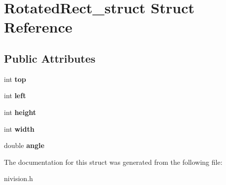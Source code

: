 \hypertarget{structRotatedRect__struct}{\section{\-Rotated\-Rect\-\_\-struct \-Struct \-Reference}
\label{structRotatedRect__struct}
}
\subsection*{\-Public \-Attributes}
\begin{DoxyCompactItemize}
\item 
\hypertarget{structRotatedRect__struct_a4f46f68321817b7ddda9cb4be08b8adc}{int {\bfseries top}}\label{structRotatedRect__struct_a4f46f68321817b7ddda9cb4be08b8adc}

\item 
\hypertarget{structRotatedRect__struct_afae18c17d6438f798c5c3d92709ebbf9}{int {\bfseries left}}\label{structRotatedRect__struct_afae18c17d6438f798c5c3d92709ebbf9}

\item 
\hypertarget{structRotatedRect__struct_a716ef359f909ac74d421d79f766136b2}{int {\bfseries height}}\label{structRotatedRect__struct_a716ef359f909ac74d421d79f766136b2}

\item 
\hypertarget{structRotatedRect__struct_a7cb9c79b581e847b02c3d25beaa2fd06}{int {\bfseries width}}\label{structRotatedRect__struct_a7cb9c79b581e847b02c3d25beaa2fd06}

\item 
\hypertarget{structRotatedRect__struct_ac0a34f120865456702b7f1dd10cddc9c}{double {\bfseries angle}}\label{structRotatedRect__struct_ac0a34f120865456702b7f1dd10cddc9c}

\end{DoxyCompactItemize}


\-The documentation for this struct was generated from the following file\-:\begin{DoxyCompactItemize}
\item 
nivision.\-h\end{DoxyCompactItemize}
